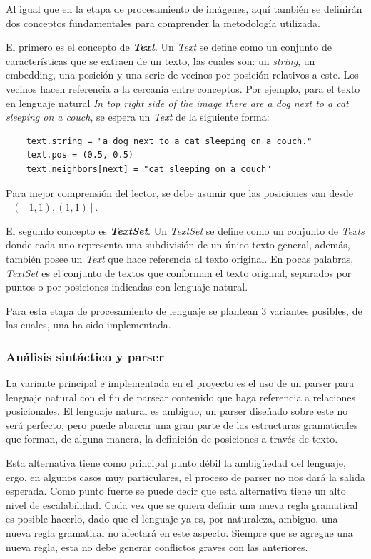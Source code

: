 Al igual que en la etapa de procesamiento de imágenes, aquí también se definirán dos conceptos fundamentales para comprender la metodología utilizada.

El primero es el concepto de \textit{\textbf{Text}}. Un \textit{Text} se define como un conjunto de características que se extraen de un texto, las cuales son: un \textit{string}, un embedding, una posición y una serie de vecinos por posición relativos a este. Los vecinos hacen referencia a la cercanía entre conceptos. Por ejemplo, para el texto en lenguaje natural \textit{In top right side of the image there are a dog next to a cat sleeping on a couch}, se espera un \textit{Text} de la siguiente forma:

\begin{verbatim}
    text.string = "a dog next to a cat sleeping on a couch."
    text.pos = (0.5, 0.5)
    text.neighbors[next] = "cat sleeping on a couch"
\end{verbatim}

Para mejor comprensi\'on del lector, se debe asumir que las posiciones van desde $[(-1,1), (1,1)]$.

El segundo concepto es \textit{\textbf{TextSet}}. Un \textit{TextSet} se define como un conjunto de \textit{Texts} donde cada uno representa una subdivisi\'on de un \'unico texto general, además, también posee un \textit{Text} que hace referencia al texto original. En pocas palabras, \textit{TextSet} es el conjunto de textos que conforman el texto original, separados por puntos o por posiciones indicadas con lenguaje natural.

Para esta etapa de procesamiento de lenguaje se plantean 3 variantes posibles, de las cuales, una ha sido implementada.

\subsubsection{Análisis sintáctico y parser}
La variante principal e implementada en el proyecto es el uso de un parser para lenguaje natural con el fin de parsear contenido que haga referencia a relaciones posicionales. El lenguaje natural es ambiguo, un parser diseñado sobre este no será perfecto, pero puede abarcar una gran parte de las estructuras gramaticales que forman, de alguna manera, la definición de posiciones a través de texto.

Esta alternativa tiene como principal punto débil la ambigüedad del lenguaje, ergo, en algunos casos muy particulares, el proceso de parser no nos dará la salida esperada. Como punto fuerte se puede decir que esta alternativa tiene un alto nivel de escalabilidad. Cada vez que se quiera definir una nueva regla gramatical es posible hacerlo, dado que el lenguaje ya es, por naturaleza, ambiguo, una nueva regla gramatical no afectará en este aspecto. Siempre que se agregue una nueva regla, esta no debe generar conflictos graves con las anteriores.

